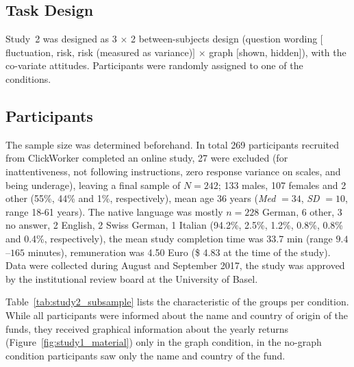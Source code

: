 \documentclass[a4paper,man, natbib,floatsintext]{apa6} %
\begin{document}
\subsection{Task Design}
Study~2 was designed as 3 $\times$ 2 between-subjects design (question wording $[$fluctuation, risk, risk (measured as variance)$]$ $\times$ graph $[$shown, hidden$]$), with the co-variate attitudes. Participants were randomly assigned to one of the conditions.

\subsection{Participants}
The sample size was determined beforehand. In total 269 participants recruited from ClickWorker completed an online study, 27 were excluded (for inattentiveness, not following instructions, zero response variance on scales, and being underage), leaving a final sample of $N = 242$; 133 males, 107 females and 2 other (55\%, 44\% and 1\%, respectively), mean age 36 years (\textit{Med} $ = 34$, \textit{SD} $= 10$, range 18-61 years). The native language was mostly $n = 228$ German, 6 other, 3 no answer, 2 English, 2 Swiss German,  1 Italian (94.2\%, 2.5\%, 1.2\%, 0.8\%, 0.8\% and 0.4\%, respectively), the mean study completion time was 33.7 min (range $9.4$--$165$ minutes), remuneration was 4.50 Euro (\$ 4.83 at the time of the study). Data were collected during August and September 2017, the study was approved by the institutional review board at the University of Basel.

Table~\ref{tab:study2_subsample} lists the characteristic of the groups per condition. While all participants were informed about the name and country of origin of the funds, they received graphical information about the yearly returns (Figure~\ref{fig:study1_material}) only in the graph condition, in the no-graph condition participants saw only the name and country of the fund. 
\end{document}
